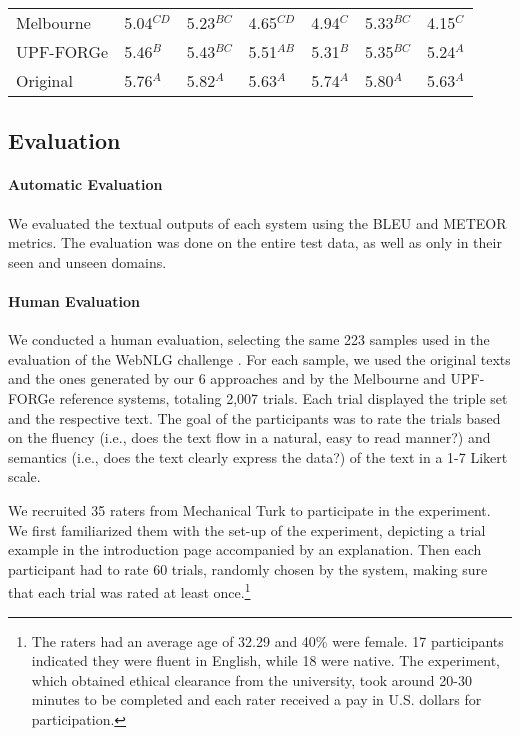 \documentclass[11pt,a4paper]{article}
\begin{document}
\begin{table*}
{\begin{tabular}{l l l l l l l}
Melbourne       & 5.04$^{CD}$ & 5.23$^{BC}$ & 4.65$^{CD}$ & 4.94$^{C}$  & 5.33$^{BC}$  & 4.15$^{C}$ \\
UPF-FORGe       & 5.46$^{B}$  & 5.43$^{BC}$ & 5.51$^{AB}$ & 5.31$^{B}$  & 5.35$^{BC}$  & 5.24$^{A}$ \\
\midrule
Original        & 5.76$^{A}$  & 5.82$^{A}$  & 5.63$^{A}$  & 5.74$^{A}$  & 5.80$^{A}$   & 5.63$^{A}$ \\
\bottomrule
\end{tabular}
}
\caption{(1) BLEU and METEOR scores of the models in the automatic evaluation, and (2) Fluency and Semantic obtained in the human evaluation. In the first part, best results are boldfaced and second best ones are underlined. In the second part, ranking was determined by pair-wise Mann-Whitney statistical tests with $p < 0.05$.}
\label{table:results2}
\end{table*}

\subsection{Evaluation}

\paragraph{Automatic Evaluation} We evaluated the textual outputs of each system using the BLEU \cite{papineni2002} and METEOR \cite{lavieAgarwal2007} metrics. The evaluation was done on the entire test data, as well as only in their seen and unseen domains.

\paragraph{Human Evaluation} We conducted a human evaluation, selecting the same 223 samples used in the evaluation of the WebNLG challenge \cite{claire2017b}. For each sample, we used the original texts and the ones generated by our 6 approaches and by the Melbourne and UPF-FORGe reference systems, totaling 2,007 trials. Each trial displayed the triple set and the respective text. The goal of the participants was to rate the trials based on the fluency (i.e., does the text flow in a natural, easy to read manner?) and semantics (i.e., does the text clearly express the data?) of the text in a 1-7 Likert scale.

We recruited 35 raters from Mechanical Turk to participate in the experiment. We first familiarized them with the set-up of the experiment, depicting a trial example in the introduction page accompanied by an explanation. Then each participant had to rate 60 trials, randomly chosen by the system, making sure that each trial was rated at least once.\footnote{The raters had an average age of 32.29 and 40\% were female. 17 participants indicated they were fluent in English, while 18 were native. The experiment, which obtained ethical clearance from the university, took around 20-30 minutes to be completed and each rater received a pay in U.S. dollars for participation.}
\end{document}
